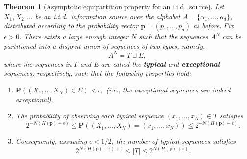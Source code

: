 \documentclass[12pt]{article}
\newtheorem{thm}{Theorem}[section]
\newcommand{\prob}{\mathbf{P}}
\theoremstyle{example}
\begin{document}
\begin{thm}[Asymptotic equipartition property for an i.i.d.\ source]
Let $X_1,X_2,\ldots$ be an i.i.d.\ information source over the alphabet $A=\{\alpha_1,\ldots,\alpha_d\}$, distributed according to the probability vector $\mathbf{p}=(p_1,\ldots,p_d)$ as before. Fix $\epsilon>0$. There exists a large enough integer $N$ such that the sequences $A^N$ can be partitioned into a disjoint union of sequences of two types, namely,
$$ A^N = T \sqcup E, $$
where the sequences in $T$ and $E$ are called the \textbf{typical} and \textbf{exceptional} sequences, respectively, such that the following properties hold:
\begin{enumerate}
\item $\prob((X_1,\ldots,X_N) \in E) < \epsilon,$ (i.e., the exceptional sequences are indeed exceptional).
\item The probability of observing each typical sequence $(x_1,\ldots,x_N)\in T$ satisfies
\begin{equation} \label{eq:aep-prob-bound}
2^{-N\left(H(\mathbf{p}) + \epsilon\right)} \le 
\prob((X_1,\ldots,X_N)=(x_1,\ldots,x_N)) \le 
2^{-N\left(H(\mathbf{p}) - \epsilon\right)}.
\end{equation}
\item Consequently, assuming $\epsilon<1/2$, the number of typical sequences satisfies
\begin{equation} \label{eq:aep-numtypical}
2^{N (H(\mathbf{p})-\epsilon)+1} \le |T| \le 2^{N (H(\mathbf{p})+\epsilon)}.
\end{equation}
\end{enumerate}
\end{thm}
\end{document}
